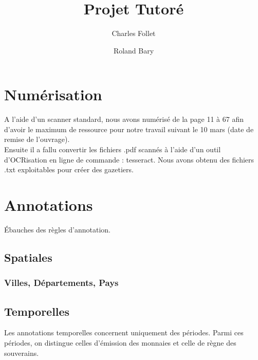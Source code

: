 \documentclass[a4paper, 11pt]{article}
\begin{document}
\title{Projet Tutoré}
\author{Charles Follet \and Roland Bary}
\maketitle
\tableofcontents
\newpage
\section{Numérisation}
A l'aide d'un scanner standard, nous avons numérisé de la page 11 à 67 afin d'avoir le maximum de ressource pour notre travail suivant le 10 mars (date de remise de l'ouvrage).\\
Ensuite il a fallu convertir les fichiers .pdf scannés à l'aide d'un outil d'OCRisation en ligne de commande : tesseract. Nous avons obtenu des fichiers .txt exploitables pour créer des gazetiers.
\section{Annotations}
Ébauches des règles d'annotation.
\subsection{Spatiales}
\subsubsection{Villes, Départements, Pays}

\newpage
\subsection{Temporelles}
Les annotations temporelles concernent uniquement des périodes. Parmi ces périodes, on distingue celles d'émission des monnaies et celle de règne des souverains.
\end{document}
